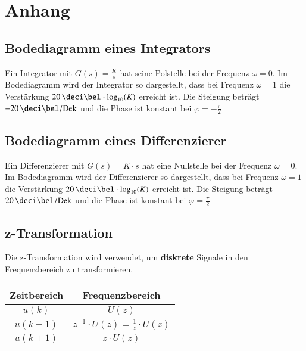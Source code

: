 \section{Anhang}

\subsection{Bodediagramm eines Integrators}
\label{Bodediagramm eines Integrators}

Ein Integrator mit $G(s) = \frac{K}{s}$ hat seine Polstelle bei der Frequenz $\omega = 0$. Im Bodediagramm wird der Integrator so
dargestellt, dass bei Frequenz $\omega = 1$ die Verstärkung $20 \, \deci \bel \cdot \log_{10}(K)$ erreicht ist. 
Die Steigung beträgt $-20 \, \deci \bel / \mathrm{Dek}$ und die Phase ist konstant bei $\varphi = -\frac{\pi}{2}$

 


\subsection{Bodediagramm eines Differenzierer}

Ein Differenzierer mit $G(s) = K \cdot s$ hat eine Nullstelle bei der Frequenz $\omega = 0$. Im Bodediagramm wird der Differenzierer so
dargestellt, dass bei Frequenz $\omega = 1$ die Verstärkung $20 \, \deci \bel \cdot \log_{10}(K)$ erreicht ist.
Die Steigung beträgt $20 \, \deci \bel / \mathrm{Dek}$ und die Phase ist konstant bei $\varphi = \frac{\pi}{2}$

 


\subsection{z-Transformation}
\label{z-Transformation}

Die z-Transformation wird verwendet, um \textbf{diskrete} Signale in den Frequenzbereich zu transformieren.

\renewcommand{\arraystretch}{1.4}

\begin{center}
    \begin{tabular}{c | c}
        \textbf{Zeitbereich}    & \textbf{Frequenzbereich}  \\
        \midrule
        $u(k)$                  & $U(z)$                    \\
        $u(k-1)$                & $z^{-1} \cdot U(z) = \frac{1}{z} \cdot U(z)$ \\
        $u(k+1)$                & $z \cdot U(z)$
    \end{tabular}
\end{center}


